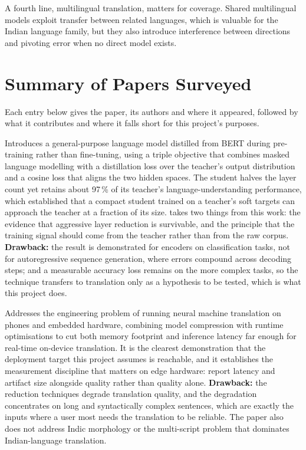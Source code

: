 A fourth line, multilingual translation, matters for coverage. Shared
multilingual models exploit transfer between related languages, which is
valuable for the Indian language family, but they also introduce interference
between directions and pivoting error when no direct model exists.

\section{Summary of Papers Surveyed}
\label{sec:papers}

Each entry below gives the paper, its authors and where it appeared, followed
by what it contributes and where it falls short for this project's purposes.

Introduces a general-purpose language model distilled from BERT during
pre-training rather than fine-tuning, using a triple objective that combines
masked language modelling with a distillation loss over the teacher's output
distribution and a cosine loss that aligns the two hidden spaces. The student
halves the layer count yet retains about 97\,\% of its teacher's
language-understanding performance, which established that a compact student
trained on a teacher's soft targets can approach the teacher at a fraction of
its size. \setu{} takes two things from this work: the evidence that aggressive
layer reduction is survivable, and the principle that the training signal
should come from the teacher rather than from the raw corpus.
\textbf{Drawback:} the result is demonstrated for encoders on classification
tasks, not for autoregressive sequence generation, where errors compound across
decoding steps; and a measurable accuracy loss remains on the more complex
tasks, so the technique transfers to translation only as a hypothesis to be
tested, which is what this project does.

Addresses the engineering problem of running neural machine translation on
phones and embedded hardware, combining model compression with runtime
optimisations to cut both memory footprint and inference latency far enough for
real-time on-device translation. It is the clearest demonstration that the
deployment target this project assumes is reachable, and it establishes the
measurement discipline that matters on edge hardware: report latency and
artifact size alongside quality rather than quality alone.
\textbf{Drawback:} the reduction techniques degrade translation quality, and
the degradation concentrates on long and syntactically complex sentences, which
are exactly the inputs where a user most needs the translation to be reliable.
The paper also does not address Indic morphology or the multi-script problem
that dominates Indian-language translation.

